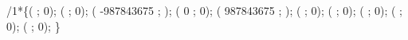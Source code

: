 /1*\{(  ; 0); 
(  ; 0); 
( -987843675 ; ); 
( 0 ; 0); 
( 987843675 ; ); 
(  ; 0); 
(  ; 0); 
(  ; 0); 
(  ; 0); 
(  ; 0); 
\}